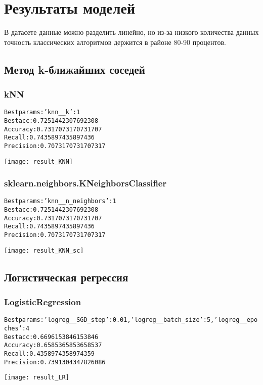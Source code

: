 \graphicspath{{images/}}
\section{Результаты моделей}
В датасете данные можно разделить линейно, но из-за низкого количества данных точность классических алгоритмов держится в районе 80-90 процентов.

\subsection{Метод k-ближайших соседей}
\subsubsection{kNN}
\begin{alltt}
Best params: {'knn__k': 1}
Best acc: 0.7251442307692308
Accuracy: 0.7317073170731707
Recall: 0.7435897435897436
Precision: 0.7073170731707317
\end{alltt}
\begin{center}
\texttt{[image: result\_KNN]}
\end{center}
\pagebreak

\subsubsection{sklearn.neighbors.KNeighborsClassifier}
\begin{alltt}
Best params: {'knn__n_neighbors': 1}
Best acc: 0.7251442307692308
Accuracy: 0.7317073170731707
Recall: 0.7435897435897436
Precision: 0.7073170731707317
\end{alltt}
\begin{center}
\texttt{[image: result\_KNN\_sc]}
\end{center}
\pagebreak

\subsection{Логистическая регрессия}
\subsubsection{LogisticRegression}
\begin{alltt}
Best params: {'logreg__SGD_step': 0.01, 'logreg__batch_size': 5, 'logreg__epoches': 4}
Best acc: 0.6696153846153846
Accuracy: 0.6585365853658537
Recall: 0.4358974358974359
Precision: 0.7391304347826086
\end{alltt}
\begin{center}
\texttt{[image: result\_LR]}
\end{center}

